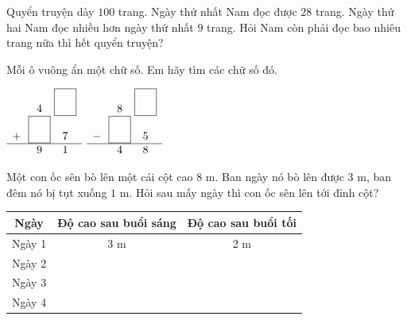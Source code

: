 \documentclass[../main.tex]{subfiles}
\begin{document}
\newpage
\begin{bt}
    Quyển truyện dày $100$ trang. Ngày thứ nhất Nam đọc được $28$ trang. Ngày thứ hai Nam đọc nhiều hơn ngày thứ nhất $9$ trang. Hỏi Nam còn phải đọc bao nhiêu trang nữa thì hết quyển truyện?
\end{bt}

\begin{bt}
    Mỗi ô vuông ẩn một chữ số. Em hãy tìm các chữ số đó.
    \par\smallskip
    {\centering
    $\begin{array}{r@{\ }c@{\ }c}
        & 4 & \TTdien[0.7cm] \\
        +\ & \TTdien[0.7cm] & 7 \\
        \hline
        & 9 & 1
    \end{array}$
    \hspace{3cm}
    $\begin{array}{r@{\ }c@{\ }c}
        & 8 & \TTdien[0.7cm] \\
        -\ & \TTdien[0.7cm] & 5 \\
        \hline
        & 4 & 8
    \end{array}$\par}
\end{bt}

\begin{bt}
    Một con ốc sên bò lên một cái cột cao $8$ m. Ban ngày nó bò lên được $3$ m, ban đêm nó bị tụt xuống $1$ m. Hỏi sau mấy ngày thì con ốc sên lên tới đỉnh cột?
    \TTbatdauhinh
    \noindent\begin{minipage}[c]{0.24\linewidth}\centering
        \TTcotoc
    \end{minipage}\hfill
    \begin{minipage}[c]{0.74\linewidth}\centering
        \renewcommand{\arraystretch}{1.3}
        \begin{tabular}{|c|c|c|}
            \hline
            \textbf{Ngày} & \textbf{Độ cao sau buổi sáng} & \textbf{Độ cao sau buổi tối} \\
            \hline
            Ngày 1 & 3 m & 2 m \\
            \hline
            Ngày 2 & \ \ \ \ \ \ \ \ \ \ \ \ & \ \ \ \ \ \ \ \ \ \ \ \ \\
            \hline
            Ngày 3 & & \\
            \hline
            Ngày 4 & & \\
            \hline
        \end{tabular}
    \end{minipage}\par
    \TTdapso
\end{bt}
\end{document}
